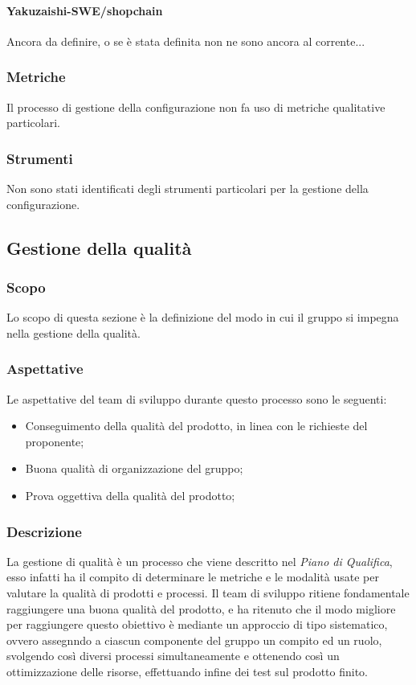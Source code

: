         \paragraph{Yakuzaishi-SWE/shopchain}
        Ancora da definire, o se è stata definita non ne sono ancora al corrente...



    \subsubsection{Metriche}
    Il processo di gestione della configurazione non fa uso di metriche qualitative particolari.
    
    \subsubsection{Strumenti}
    Non sono stati identificati degli strumenti particolari per la gestione della configurazione.



\subsection{Gestione della qualità}\label{subsection: gestione_qualita}
\subsubsection{Scopo}
Lo scopo di questa sezione è la definizione del modo in cui il gruppo si impegna nella gestione della qualità.
\subsubsection{Aspettative}
Le aspettative del team di sviluppo durante questo processo sono le seguenti:
\begin {itemize}
    \item Conseguimento della qualità del prodotto, in linea con le richieste del proponente;
    \item Buona qualità di organizzazione del gruppo;
    \item Prova oggettiva della qualità del prodotto;
\end {itemize}
\subsubsection{Descrizione}
La gestione di qualità è un processo che viene descritto nel \textit{Piano di Qualifica}, esso infatti ha il compito di determinare le metriche e le modalità usate per valutare la qualità di prodotti e processi.
Il team di sviluppo ritiene fondamentale raggiungere una buona qualità del prodotto, e ha ritenuto che il modo migliore per raggiungere questo obiettivo è mediante un approccio di tipo sistematico, ovvero assegnndo a ciascun componente del gruppo un compito ed un ruolo, svolgendo così diversi processi simultaneamente e ottenendo così un ottimizzazione delle risorse, effettuando infine dei test sul prodotto finito. 
